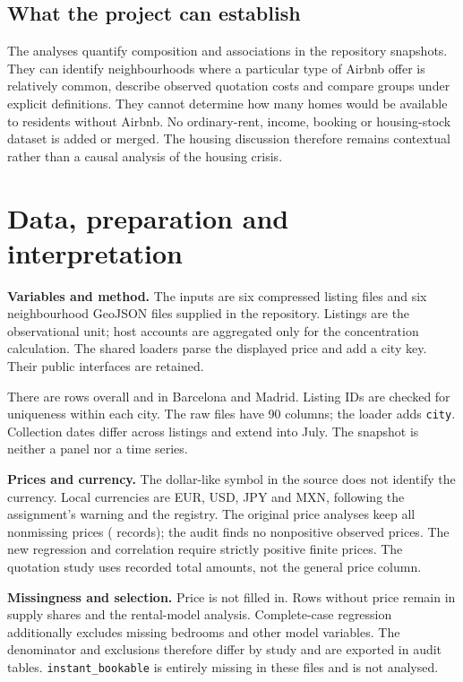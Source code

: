 \documentclass[11pt,a4paper]{article}
\newcommand{\resulttable}[3]{\begin{table}[htbp]\centering\small\sbox{\tablebox}{}\ifdim\wd\tablebox>\linewidth\resizebox{\linewidth}{!}{\usebox{\tablebox}}\else\usebox{\tablebox}\fi\caption{#2}\label{#3}\end{table}}
\newcommand{\method}[1]{\textbf{Variables and method.} #1}
\begin{document}
\subsection{What the project can establish}
The analyses quantify composition and associations in the repository snapshots. They can identify neighbourhoods where a particular type of Airbnb offer is relatively common, describe observed quotation costs and compare groups under explicit definitions. They cannot determine how many homes would be available to residents without Airbnb. No ordinary-rent, income, booking or housing-stock dataset is added or merged. The housing discussion therefore remains contextual rather than a causal analysis of the housing crisis.

\clearpage
\section{Data, preparation and interpretation}
\method{The inputs are six compressed listing files and six neighbourhood GeoJSON files supplied in the repository. Listings are the observational unit; host accounts are aggregated only for the concentration calculation. The shared loaders parse the displayed price and add a city key. Their public interfaces are retained.}
\resulttable{data_audit}{Snapshot coverage and selected missing values. Dates are month--day in 2026. Missing-bedroom counts refer to all listings.}{tab:audit}
There are \TotalListings{} rows overall and \TotalSpain{} in Barcelona and Madrid. Listing IDs are checked for uniqueness within each city. The raw files have 90 columns; the loader adds \texttt{city}. Collection dates differ across listings and extend into July. The snapshot is neither a panel nor a time series.

\textbf{Prices and currency.} The dollar-like symbol in the source does not identify the currency. Local currencies are EUR, USD, JPY and MXN, following the assignment's warning and the registry. The original price analyses keep all nonmissing prices (\TotalPriced{} records); the audit finds no nonpositive observed prices. The new regression and correlation require strictly positive finite prices. The quotation study uses recorded total amounts, not the general price column.

\textbf{Missingness and selection.} Price is not filled in. Rows without price remain in supply shares and the rental-model analysis. Complete-case regression additionally excludes missing bedrooms and other model variables. The denominator and exclusions therefore differ by study and are exported in audit tables. \texttt{instant\_bookable} is entirely missing in these files and is not analysed.
\end{document}

